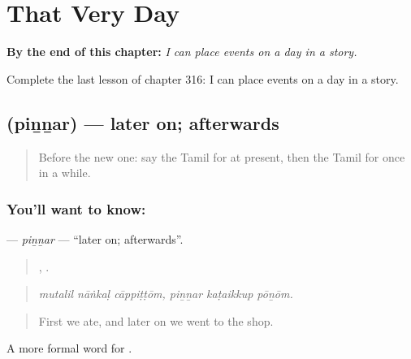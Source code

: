 
\chapter{That Very Day}
\label{ch:ta-that-very-day}

\begin{chapteropening}
\textbf{By the end of this chapter:} \emph{I can place events on a day in a story.}

Complete the last lesson of chapter 316: I can place events on a day in a story.
\end{chapteropening}

\section[\texorpdfstring{\ta{பின்னர்} (piṉṉar)}{பின்னர் (piṉṉar)}]{ (piṉṉar) — later on; afterwards}

\label{lesson:TA-C316-pinnar}



\begin{quote}
Before the new one: say the Tamil for at present, then the Tamil for once in a while.
\end{quote}

\subsection*{You'll want to know: }
\textbf{} — \emph{piṉṉar} — \textquotedblleft{}later on; afterwards\textquotedblright{}.

\begin{quote}
  ,   .
\end{quote}

\begin{quote}
\emph{mutalil nāṅkaḷ cāppiṭṭōm, piṉṉar kaṭaikkup pōṉōm.}
\end{quote}

\begin{quote}
First we ate, and later on we went to the shop.
\end{quote}

A more formal word for .

